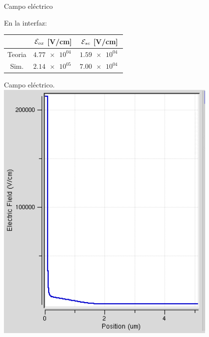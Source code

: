\documentclass{/home/daniel/GitHub/USC-Physics-Degree-Notes/Notes/Presentacion}
\begin{document}
\begin{frame}{Campo eléctrico}
    \begin{minipage}{0.4\linewidth}
        \begin{center}
            \small
            En la interfaz: 
            \vspace*{1em}

            \begin{tabular}{ccc}
                \toprule
                & $\mathcal{E}_{ox} $ [V/cm] & $\mathcal{E}_{sc} $ [V/cm]   \\ \midrule
                Teoria &  $\SI{4.77e+04}{}$ &  $\SI{1.59e+04}{}$ \\
                Sim. &  $\SI{2.14e+05}{}$ &  $\SI{7.00e+04}{}$  \\
                \bottomrule
            \end{tabular}
        \end{center}
    \end{minipage}
    \hfill
    \begin{minipage}{0.55\linewidth} 
        \centering
        Campo eléctrico.
        \vspace*{1em}
        \includegraphics[width=0.7\linewidth]{../Imagenes/1-Field.png}
    \end{minipage}
\end{frame}

\end{document}

